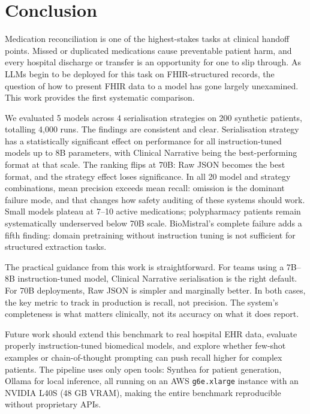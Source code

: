 \section{Conclusion}
\label{sec:conclusion}

Medication reconciliation is one of the highest-stakes tasks at clinical handoff points.
Missed or duplicated medications cause preventable patient harm, and every hospital
discharge or transfer is an opportunity for one to slip through. As LLMs begin to be
deployed for this task on FHIR-structured records, the question of how to present FHIR
data to a model has gone largely unexamined. This work provides the first systematic
comparison.

We evaluated 5 models across 4 serialisation strategies on 200 synthetic patients,
totalling 4,000 runs. The findings are consistent and clear. Serialisation strategy
has a statistically significant effect on performance for all instruction-tuned models
up to 8B parameters, with Clinical Narrative being the best-performing format at that
scale. The ranking flips at 70B: Raw JSON becomes the best format, and the strategy
effect loses significance. In all 20 model and strategy combinations, mean precision
exceeds mean recall: omission is the dominant failure mode, and that changes how safety
auditing of these systems should work. Small models plateau at 7--10 active medications;
polypharmacy patients remain systematically underserved below 70B scale. BioMistral's
complete failure adds a fifth finding: domain pretraining without instruction tuning is
not sufficient for structured extraction tasks.

The practical guidance from this work is straightforward. For teams using a 7B--8B
instruction-tuned model, Clinical Narrative serialisation is the right default. For
70B deployments, Raw JSON is simpler and marginally better. In both cases, the key
metric to track in production is recall, not precision. The system's completeness is
what matters clinically, not its accuracy on what it does report.

Future work should extend this benchmark to real hospital EHR data, evaluate
properly instruction-tuned biomedical models, and explore whether few-shot examples
or chain-of-thought prompting can push recall higher for complex patients. The pipeline
uses only open tools: Synthea for patient generation, Ollama for local inference, all
running on an AWS \texttt{g6e.xlarge} instance with an NVIDIA L40S (48 GB VRAM),
making the entire benchmark reproducible without proprietary APIs.
